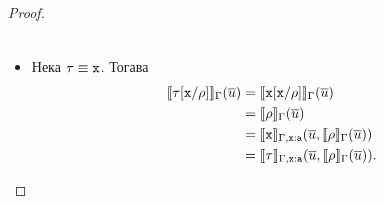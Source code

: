\begin{proof}
\begin{itemize}
\begin{align*}
    \end{align*}
  \item
    Нека $\tau \equiv \texttt{x}$. %
    Тогава
    \begin{align*}
      \llbracket{\tau[\texttt{x}/{\rho}]}\rrbracket_\Gamma(\overline{u}) & = \llbracket{\texttt{x}[\texttt{x}/{\rho}]}\rrbracket_\Gamma(\overline{u})\\
                                               & = \llbracket{\rho}\rrbracket_\Gamma(\overline{u})\\
                                               & = \llbracket{\texttt{x}}\rrbracket_{\Gamma,\texttt{x}:\texttt{a}}(\overline{u},\llbracket{\rho}\rrbracket_\Gamma(\overline{u}))\\
                                               & = \llbracket{\tau}\rrbracket_{\Gamma,\texttt{x}:\texttt{a}}(\overline{u},\llbracket{\rho}\rrbracket_\Gamma(\overline{u})).
    \end{align*}
  \end{itemize}


\end{proof}
